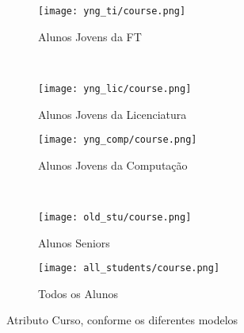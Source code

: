 \clearpage
\begin{figure}[!ht]
    \centering
    \begin{subfigure}[b]{0.48\textwidth}
        \centering
        \texttt{[image: yng\_ti/course.png]}
        \caption{Alunos Jovens da FT}
    \end{subfigure}
    ~
    \begin{subfigure}[b]{0.48\textwidth}
        \centering
        \texttt{[image: yng\_lic/course.png]}
        \caption{Alunos Jovens da Licenciatura}
    \end{subfigure}

    \begin{subfigure}[b]{0.48\textwidth}
        \centering
        \texttt{[image: yng\_comp/course.png]}
        \caption{Alunos Jovens da Computação}
    \end{subfigure}
    ~
    \begin{subfigure}[b]{0.48\textwidth}
        \centering
        \texttt{[image: old\_stu/course.png]}
        \caption{Alunos Seniors}
    \end{subfigure}

    \begin{subfigure}[b]{0.48\textwidth}
        \centering
        \texttt{[image: all\_students/course.png]}
        \caption{Todos os Alunos}
    \end{subfigure}
    \caption{Atributo Curso, conforme os diferentes modelos}
\end{figure}

